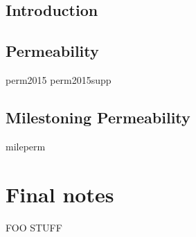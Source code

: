 \documentclass[12pt, chapterheads, final]{ucsd}
\begin{document}
%


\begin{refsection}
\chapter{Introduction}
\end{refsection}

\newpage
\begin{refsection}
\chapter{Permeability}
{perm2015}
{perm2015supp}
\printbibliography[segment=\therefsegment]{}
\end{refsection}

\newpage
\begin{refsection}
\chapter{Milestoning Permeability}
{mileperm}
\printbibliography[segment=\therefsegment]{}
\end{refsection}


\appendix
\chapter{Final notes}
FOO STUFF


% 
\end{document}

